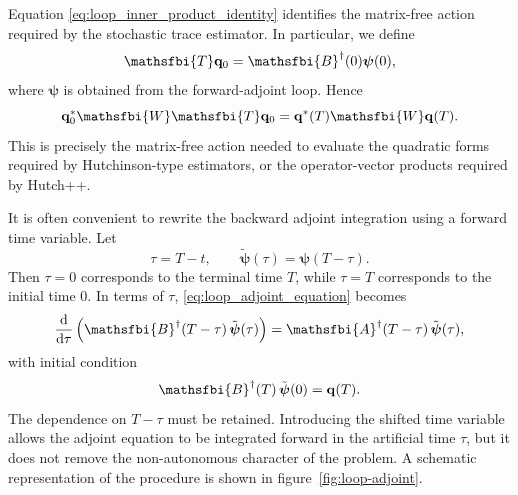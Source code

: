 \begin{appendices}
Equation \eqref{eq:loop_inner_product_identity} identifies the matrix-free action required by the stochastic trace estimator. In particular, we define
\begin{equation}
  \mathsfbi{T}\mathbf{q}_0
  =
  \mathsfbi{B}^{\dagger}(0)\boldsymbol{\psi}(0),
  \label{eq:loop_T_action}
\end{equation}
where \(\boldsymbol{\psi}\) is obtained from the forward-adjoint loop. Hence
\begin{equation}
  \mathbf{q}_0^{*}
  \mathsfbi{W}
  \mathsfbi{T}\mathbf{q}_0
  =
  \mathbf{q}^{*}(T)\mathsfbi{W}\mathbf{q}(T).
  \label{eq:loop_T_quadratic_form}
\end{equation}
This is precisely the matrix-free action needed to evaluate the quadratic forms required by Hutchinson-type estimators, or the operator-vector products required by Hutch++.

It is often convenient to rewrite the backward adjoint integration using a forward time variable. Let
\begin{equation}
  \tau = T-t,
  \qquad
  \tilde{\boldsymbol{\psi}}(\tau)
  =
  \boldsymbol{\psi}(T-\tau).
  \label{eq:loop_shifted_time_definition}
\end{equation}
Then \(\tau=0\) corresponds to the terminal time \(T\), while \(\tau=T\) corresponds to the initial time \(0\). In terms of \(\tau\), \eqref{eq:loop_adjoint_equation} becomes
\begin{equation}
  \frac{\mathrm{d}}{\mathrm{d}\tau}
  \left(
    \mathsfbi{B}^{\dagger}(T-\tau)\,
    \tilde{\boldsymbol{\psi}}(\tau)
  \right)
  =
  \mathsfbi{A}^{\dagger}(T-\tau)\,
  \tilde{\boldsymbol{\psi}}(\tau),
  \label{eq:loop_adjoint_shifted_time}
\end{equation}
with initial condition
\begin{equation}
  \mathsfbi{B}^{\dagger}(T)\,
  \tilde{\boldsymbol{\psi}}(0)
  =
  \mathbf{q}(T).
  \label{eq:loop_adjoint_shifted_initial_condition}
\end{equation}
The dependence on \(T-\tau\) must be retained. Introducing the shifted time variable allows the adjoint equation to be integrated forward in the artificial time \(\tau\), but it does not remove the non-autonomous character of the problem. A schematic representation of the procedure is shown in figure~\ref{fig:loop-adjoint}.
\begin{figure}
  \centering
  \begin{tikzpicture}[
    font=\footnotesize,
    block/.style={
      draw,
      rectangle,
      minimum height=1.1cm,
      minimum width=4.2cm,
      align=center
    },
    arrow/.style={->, thick}
  ]


\end{tikzpicture}
\end{figure}
\end{appendices}

